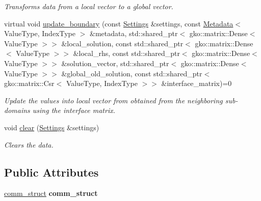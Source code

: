 \begin{DoxyCompactItemize}
\begin{DoxyCompactList}\small\item\em Transforms data from a local vector to a global vector. \end{DoxyCompactList}\item 
virtual void \hyperlink{classSchwarzWrappers_1_1Communicate_a8a9a11831c9811420deaf94c8209f1bc}{update\+\_\+boundary} (const \hyperlink{structSchwarzWrappers_1_1Settings}{Settings} \&settings, const \hyperlink{structSchwarzWrappers_1_1Metadata}{Metadata}$<$ Value\+Type, Index\+Type $>$ \&metadata, std\+::shared\+\_\+ptr$<$ gko\+::matrix\+::\+Dense$<$ Value\+Type $>$$>$ \&local\+\_\+solution, const std\+::shared\+\_\+ptr$<$ gko\+::matrix\+::\+Dense$<$ Value\+Type $>$$>$ \&local\+\_\+rhs, const std\+::shared\+\_\+ptr$<$ gko\+::matrix\+::\+Dense$<$ Value\+Type $>$$>$ \&solution\+\_\+vector, std\+::shared\+\_\+ptr$<$ gko\+::matrix\+::\+Dense$<$ Value\+Type $>$$>$ \&global\+\_\+old\+\_\+solution, const std\+::shared\+\_\+ptr$<$ gko\+::matrix\+::\+Csr$<$ Value\+Type, Index\+Type $>$$>$ \&interface\+\_\+matrix)=0
\begin{DoxyCompactList}\small\item\em Update the values into local vector from obtained from the neighboring sub-\/domains using the interface matrix. \end{DoxyCompactList}\item 
\mbox{\label{classSchwarzWrappers_1_1Communicate_ae20e561fceccc6f7b88bf9fdd5a212f9}} 
void \hyperlink{classSchwarzWrappers_1_1Communicate_ae20e561fceccc6f7b88bf9fdd5a212f9}{clear} (\hyperlink{structSchwarzWrappers_1_1Settings}{Settings} \&settings)
\begin{DoxyCompactList}\small\item\em Clears the data. \end{DoxyCompactList}\end{DoxyCompactItemize}
\subsection*{Public Attributes}
\begin{DoxyCompactItemize}
\item 
\mbox{\label{classSchwarzWrappers_1_1Communicate_a5dd94c64f1af7a06d46c28e6df46fa3c}} 
\hyperlink{structSchwarzWrappers_1_1Communicate_1_1comm__struct}{comm\+\_\+struct} {\bfseries comm\+\_\+struct}
\end{DoxyCompactItemize}
